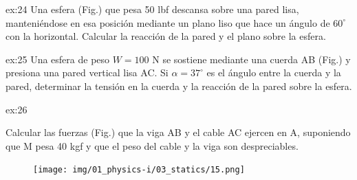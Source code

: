 \begin{multicols}{2}
\begin{excercise}{ex:24}
{        Una esfera (Fig.) que pesa 50 lbf descansa sobre una pared lisa, manteniéndose en esa posición mediante un plano liso que hace un ángulo de $60^\circ$ con la horizontal. Calcular la reacción de la pared y el plano sobre la esfera.   
        } 
     \end{excercise}    
     \begin{excercise}{ex:25}{
        Una esfera de peso $W=100$ N se sostiene mediante una cuerda AB (Fig.) y presiona una pared vertical lisa AC. Si $\alpha=37^\circ$ es el ángulo entre la cuerda y la pared, determinar la tensión en la cuerda y la reacción de la pared sobre la esfera.  
        } 
     \end{excercise}

     \begin{excercise}[][][$(a)\ T=56.7\ \mathrm{Kgf} $, $R=40\ \mathrm{Kgf}$, $(b)\ T=69.2\ \mathrm{Kgf} $, $R=40\ \mathrm{Kgf}$]{ex:26}{
        Calcular las fuerzas (Fig.) que la viga AB y el cable AC ejercen en A, suponiendo que M pesa 40 kgf y que el peso del cable y la viga son despreciables.     
         \begin{figure}[H]
             \centering
             \texttt{[image: img/01\_physics-i/03\_statics/15.png]}
         \end{figure}
         } 
     \end{excercise}


\end{multicols}
